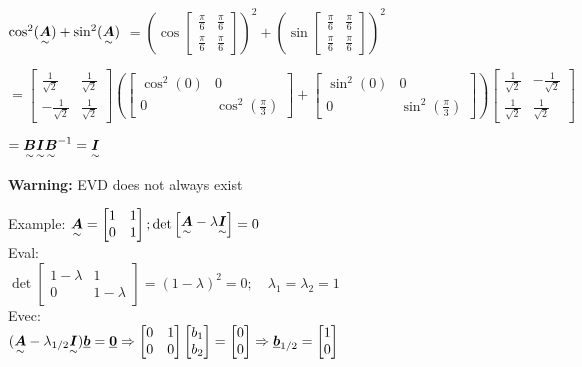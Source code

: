 $\cos^2(\underset{\sim}{\boldsymbol {A}})+\sin^2(\underset{\sim}{\boldsymbol {A}})$
$=\left(\cos\begin{bmatrix}\frac{\pi}{6}&\frac{\pi}{6}\\\frac{\pi}{6}&\frac{\pi}{6}\end{bmatrix}\right)^2
+\left(\sin\begin{bmatrix}\frac{\pi}{6}&\frac{\pi}{6}\\\frac{\pi}{6}&\frac{\pi}{6}\end{bmatrix}\right)^2 $


$=\begin{bmatrix}\frac{1}{\sqrt{2}}&\frac{1}{\sqrt{2}}\\-\frac{1}{\sqrt{2}}&\frac{1}{\sqrt{2}}\end{bmatrix}
\left(
\begin{bmatrix}\cos^2(0)&0\\0&\cos^2(\frac{\pi}{3})\end{bmatrix}
+\begin{bmatrix}\sin^2(0)&0\\0&\sin^2(\frac{\pi}{3})\end{bmatrix}
\right)
\begin{bmatrix}\frac{1}{\sqrt{2}}&-\frac{1}{\sqrt{2}}\\\frac{1}{\sqrt{2}}&\frac{1}{\sqrt{2}}\end{bmatrix}$


$=\underset{\sim}{\boldsymbol {B}}\underset{\sim}{\boldsymbol {I}}\underset{\sim}{\boldsymbol {B}}^{-1}=\underset{\sim}{\boldsymbol {I}}$



\textbf{Warning:} EVD does not always exist

Example: $\underset{\sim}{\boldsymbol {A}}=\begin{bmatrix}1&1\\0&1\end{bmatrix}; \det\begin{bmatrix}\underset{\sim}{\boldsymbol {A}}-\lambda\underset{\sim}{\boldsymbol {I}}\end{bmatrix}=0$\\
\newpage
Eval:\\

$\det\begin{bmatrix}1-\lambda&1\\0&1-\lambda\end{bmatrix}=(1-\lambda)^2=0; \quad \lambda_1=\lambda_2=1$\\

Evec:\\

$(\underset{\sim}{\boldsymbol {A}}-\lambda_{1/2}\underset{\sim}{\boldsymbol {I}})\underline{\boldsymbol {b}}=\underline{\boldsymbol {0}} \Rightarrow \begin{bmatrix}0&1\\0&0\end{bmatrix}\begin{bmatrix}b_1\\b_2\end{bmatrix}=\begin{bmatrix}0\\0\end{bmatrix}\Rightarrow \underline{\boldsymbol {b}}_{1/2}=\begin{bmatrix}1\\0\end{bmatrix}$


